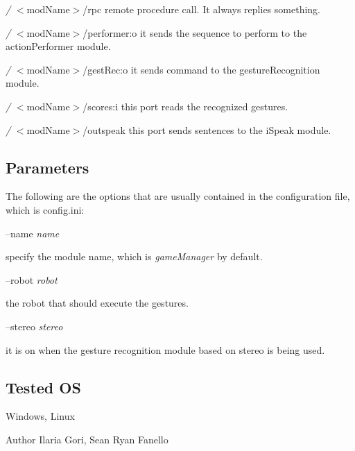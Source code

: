\begin{DoxyItemize}
\item {\itshape /} $<$mod\+Name$>$/rpc remote procedure call. It always replies something.
\item {\itshape /} $<$mod\+Name$>$/performer\+:o it sends the sequence to perform to the action\+Performer module.
\item {\itshape /} $<$mod\+Name$>$/gest\+Rec\+:o it sends command to the gesture\+Recognition module.
\item {\itshape /} $<$mod\+Name$>$/scores\+:i this port reads the recognized gestures.
\item {\itshape /} $<$mod\+Name$>$/outspeak this port sends sentences to the i\+Speak module.
\end{DoxyItemize}\hypertarget{group__gestureRecognitionStereo_parameters_sec}{}\subsection{Parameters}\label{group__gestureRecognitionStereo_parameters_sec}
The following are the options that are usually contained in the configuration file, which is config.\+ini\+:

--name {\itshape name} 
\begin{DoxyItemize}
\item specify the module name, which is {\itshape game\+Manager} by default.
\end{DoxyItemize}

--robot {\itshape robot} 
\begin{DoxyItemize}
\item the robot that should execute the gestures.
\end{DoxyItemize}

--stereo {\itshape stereo} 
\begin{DoxyItemize}
\item it is on when the gesture recognition module based on stereo is being used.
\end{DoxyItemize}\hypertarget{group__gestureRecognitionStereo_tested_os_sec}{}\subsection{Tested OS}\label{group__gestureRecognitionStereo_tested_os_sec}
Windows, Linux

\begin{DoxyAuthor}{Author}
Ilaria Gori, Sean Ryan Fanello 
\end{DoxyAuthor}
